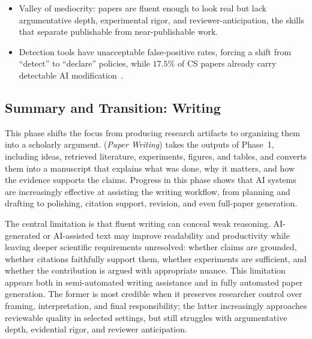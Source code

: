 \documentclass{llmxive}
\providecommand{\levelbadge}[2]{  \tcbox[on line, nobeforeafter, tcbox raise base,
         boxsep=0pt, left=2pt, right=2pt, top=0.5pt, bottom=0.5pt,
         arc=1.5pt, boxrule=0.3pt,
         colback=#1!15, colframe=#1!70]    {\scriptsize\bfseries\sffamily#2}}
\providecommand{\Sfive}{\texorpdfstring{\levelbadge{S5color}{S5}}{S5}\xspace}
\providecommand{\anadotrule}{\par\vspace{2pt}\noindent\dotfill\par\vspace{2pt}}
\begin{document}
{\anadotrule
\begin{itemize}[leftmargin=8pt, itemsep=0pt, topsep=0pt, parsep=0pt]
\item Valley of mediocrity: papers are fluent enough to look real but lack argumentative depth, experimental rigor, and reviewer-anticipation, the skills that separate publishable from near-publishable work.
\end{itemize}
\anadotrule
\begin{itemize}[leftmargin=8pt, itemsep=0pt, topsep=0pt, parsep=0pt]
\item Detection tools have unacceptable false-positive rates, forcing a shift from ``detect'' to ``declare'' policies, while $17.5\%$ of CS papers already carry detectable AI modification~\cite{liang2024mapping}.
\end{itemize}
}
\vspace{8pt}



\subsection{Summary and Transition: Writing}

\label{sec:writing_summary}

This phase shifts the focus from producing research artifacts to organizing them into a scholarly argument. \Sfive (\emph{Paper Writing}) takes the outputs of Phase~1, including ideas, retrieved literature, experiments, figures, and tables, and converts them into a manuscript that explains what was done, why it matters, and how the evidence supports the claims. Progress in this phase shows that AI systems are increasingly effective at assisting the writing workflow, from planning and drafting to polishing, citation support, revision, and even full-paper generation.

The central limitation is that fluent writing can conceal weak reasoning. AI-generated or AI-assisted text may improve readability and productivity while leaving deeper scientific requirements unresolved: whether claims are grounded, whether citations faithfully support them, whether experiments are sufficient, and whether the contribution is argued with appropriate nuance. This limitation appears both in semi-automated writing assistance and in fully automated paper generation. The former is most credible when it preserves researcher control over framing, interpretation, and final responsibility; the latter increasingly approaches reviewable quality in selected settings, but still struggles with argumentative depth, evidential rigor, and reviewer anticipation.
\end{document}
